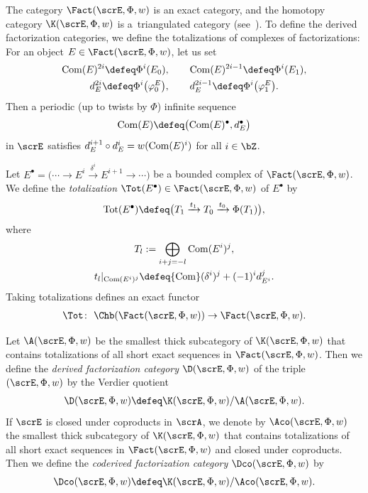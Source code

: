 The category $\Fact(\scrE,\Phi,w)$ is an exact category, and the homotopy category $\K(\scrE,\Phi,w)$ is a~triangulated category (see~\cite[Propositions~3.5 and~3.9]{H1}). To define the derived factorization categories, we define the totalizations of complexes of factorizations: For an object $E\in \Fact(\scrE,\Phi,w)$, let us set
\begin{gather*}
{\rm Com}(E)^{2i}\defeq\Phi^i(E_0), \qquad {\rm Com}(E)^{2i-1}\defeq\Phi^i(E_1),
\\
d_E^{2i}\defeq\Phi^i\big(\varphi_0^E\big),\qquad d_E^{2i-1}\defeq\Phi^i\big(\varphi_1^E\big).
\end{gather*}
Then a periodic (up to twists by $\Phi$) infinite sequence
\begin{gather*}
{\rm Com}(E)\defeq\big({\rm Com}(E)^{\bullet}, d_E^{\bullet}\big)
\end{gather*}
 in $\scrE$ satisfies $d_E^{i+1}\circ d_E^i=w({\rm Com}(E)^i)$ for all $i\in\bZ$.

\begin{dfn}
Let $E^{\bullet}=\big(\cdots\rightarrow E^i\xrightarrow{\delta^i}E^{i+1}\rightarrow\cdots\big)$ be a bounded complex of $\Fact(\scrE,\Phi,w)$. We define the {\it totalization} $\Tot(E^{\bullet})\in\Fact(\scrE,\Phi,w)$ of $E^{\bullet}$ by
\begin{gather*}
{\rm Tot}(E^{\bullet})\defeq\big(T_1\xrightarrow{t_1}T_0\xrightarrow{t_0}\Phi(T_1)\big),
\end{gather*}
where
\begin{gather*}
T_l:=\bigoplus_{i+j=-l}{\rm Com}(E^i)^j,
\\
t_l|_{{\rm Com}(E^i)^j}\defeq{\rm Com}(\delta^i)^j+(-1)^id_{E^i}^j.
\end{gather*}
Taking totalizations defines an exact functor
\begin{gather*}
\Tot\colon\ \Chb(\Fact(\scrE,\Phi,w))\rightarrow \Fact(\scrE,\Phi,w).
\end{gather*}
\end{dfn}

\begin{dfn}
Let $\A(\scrE,\Phi,w)$ be the smallest thick subcategory of $\K(\scrE,\Phi,w)$ that contains tota\-lizations of all short exact sequences in $\Fact(\scrE,\Phi,w)$. Then we define the {\it derived factorization category} $\D(\scrE,\Phi,w)$ of the triple $(\scrE,\Phi,w)$ by the Verdier quotient
\begin{gather*}
\D(\scrE,\Phi,w)\defeq\K(\scrE,\Phi,w)/\A(\scrE,\Phi,w).
\end{gather*}
If $\scrE$ is closed under coproducts in $\scrA$, we denote by
$\Aco(\scrE,\Phi,w)$ the smallest thick subcategory of $\K(\scrE,\Phi,w)$ that contains totalizations of all short exact sequences in $\Fact(\scrE,\Phi,w)$ and closed under coproducts. Then we define the {\it coderived factorization category} $\Dco(\scrE,\Phi,w)$ by
\begin{gather*}
\Dco(\scrE,\Phi,w)\defeq\K(\scrE,\Phi,w)/\Aco(\scrE,\Phi,w).
\end{gather*}
\end{dfn}

